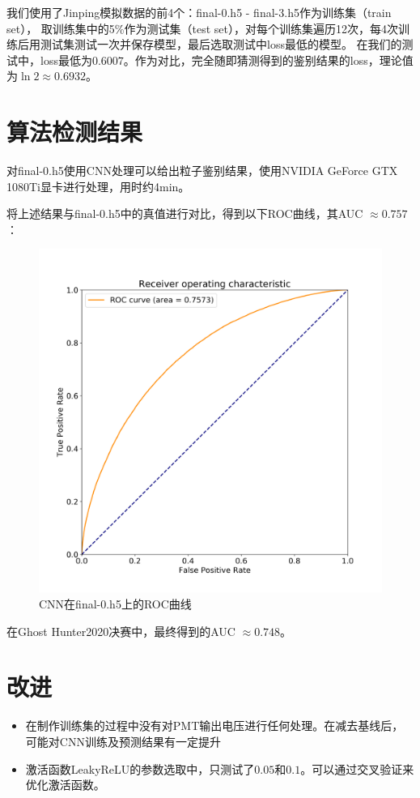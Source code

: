 \documentclass{ctexart}
\begin{document}
我们使用了Jinping模拟数据的前4个：final-0.h5 - final-3.h5作为训练集（train set），
取训练集中的5\%作为测试集（test set），对每个训练集遍历12次，每4次训练后用测试集测试一次并保存模型，最后选取测试中loss最低的模型。
在我们的测试中，loss最低为$0.6007$。作为对比，完全随即猜测得到的鉴别结果的loss，理论值为$\ln{2}\approx0.6932$。

\section{算法检测结果}
对final-0.h5使用CNN处理可以给出粒子鉴别结果，使用NVIDIA GeForce GTX 1080Ti显卡进行处理，用时约4min。

将上述结果与final-0.h5中的真值进行对比，得到以下ROC曲线，其AUC $\approx0.757$：
\begin{figure}[H]
    \centering
    \includegraphics[width=1.0\linewidth]{ROC.png}
    \caption{CNN在final-0.h5上的ROC曲线}
\end{figure}

在Ghost Hunter2020决赛中，最终得到的AUC $\approx0.748$。

\section{改进}
\begin{itemize}
    \item 在制作训练集的过程中没有对PMT输出电压进行任何处理。在减去基线后，可能对CNN训练及预测结果有一定提升
    \item 激活函数LeakyReLU的参数选取中，只测试了$0.05$和$0.1$。可以通过交叉验证来优化激活函数。
\end{itemize}
\end{document}
